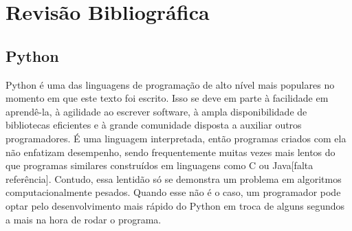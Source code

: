 \documentclass[12pt,a4paper]{ufpr}
\begin{document}

\chapter{Revisão Bibliográfica}
\label{revisao}

\section{Python}

Python é uma das linguagens de programação de alto nível mais populares no momento em que este texto foi escrito\cite{toplanguages2015}. Isso se deve em parte à facilidade em aprendê-la, à agilidade ao escrever software, à ampla disponibilidade de bibliotecas eficientes e à grande comunidade disposta a auxiliar outros programadores. 
É uma linguagem interpretada, então programas criados com ela não enfatizam desempenho, sendo frequentemente muitas vezes mais lentos do que programas similares construídos em linguagens como C ou Java[falta referência].
Contudo, essa lentidão só se demonstra um problema em algoritmos computacionalmente pesados.
Quando esse não é o caso, um programador pode optar pelo desenvolvimento mais rápido do Python em troca de alguns segundos a mais na hora de rodar o programa.
\end{document}
